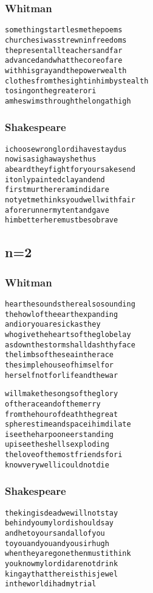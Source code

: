 \documentclass[10pt,twocolumn]{article}
\begin{document}
\begin{appendices}
\subsubsection{Whitman}
\begin{alltt}
something startles me the poems
churches i was strewn in freedoms
the present all teachers and far
advanced and what the core of are
with his gray and the power wealth
clothes from the sight in him by stealth
to sing on the greater or i
am he swims through the long at high
\end{alltt}

\subsubsection{Shakespeare}
\begin{alltt}
i choose wrong lord i have stayd us
now is a sigh away she thus
a beard they fight for your sake send
it only painted clay and end
first murtherer a mind i dare
not yet methinks you dwell with fair
a forerunner my tent and gave
him better here must be so brave
\end{alltt}

\subsection{n=2}

\subsubsection{Whitman}
\begin{alltt}
hear the sounds there also sounding
the howl of the earth expanding
and i or you are sick as they
who give the hearts of the globe lay
as down the storm shall dash thy face
the limbs of the sea in the race
the simple house of himself or
herself not for life and the war
\end{alltt}

\begin{alltt}
will make the songs of the glory
of the race and of the merry
from the hour of death the great
spheres time and space i him dilate
i see the harpooneer standing
up i see the shells exploding
the love of the most friends for i
know very well i could not die
\end{alltt}

\subsubsection{Shakespeare}
\begin{alltt}
the king is dead we will not stay	
behind you my lord i should say
and he to yours and all of you
to you and you and you sir hugh
when they are gone then must i think
you know my lord i dare not drink
king ay that there is this jewel
in the world i had my trial
\end{alltt}


\end{appendices}
\end{document}
